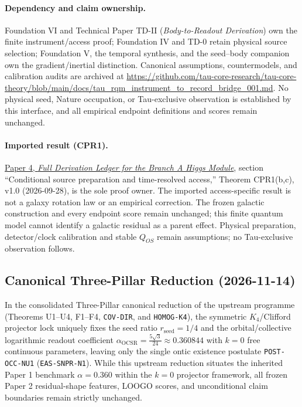 \documentclass[11pt]{article}
\begin{document}
\paragraph{Dependency and claim ownership.}
Foundation VI and Technical Paper TD-II (\emph{Body-to-Readout Derivation}) own the finite instrument/access proof; Foundation IV and TD-0 retain physical source selection; Foundation V, the temporal synthesis, and the seed--body companion own the gradient/inertial distinction. Canonical assumptions, countermodels, and calibration audits are archived at \url{https://github.com/tau-core-research/tau-core-theory/blob/main/docs/tau_rqm_instrument_to_record_bridge_001.md}. No physical seed, Nature occupation, or Tau-exclusive observation is established by this interface, and all empirical endpoint definitions and scores remain unchanged.

\paragraph{Imported result (CPR1).}
\href{https://github.com/tau-core-research/tau-core-higgs-module-paper4/blob/main/paper4_full_derivation/full_derivation.pdf#nameddest=cpr1}{Paper 4, \emph{Full Derivation Ledger for the Branch A Higgs Module}}, section ``Conditional source preparation and time-resolved access,'' Theorem CPR1(b,c), v1.0 (2026-09-28), is the sole proof owner.
The imported access-specific result is not a galaxy rotation law or an empirical correction. The frozen galactic construction and every endpoint score remain unchanged; this finite quantum model cannot identify a galactic residual as a parent effect.
Physical preparation, detector/clock calibration and stable $Q_{OS}$ remain assumptions; no Tau-exclusive observation follows.

\subsection{Canonical Three-Pillar Reduction (2026-11-14)}
In the consolidated Three-Pillar canonical reduction of the upstream programme (Theorems U1--U4, F1--F4, \texttt{COV-DIR}, and \texttt{HOMOG-K4}), the symmetric $K_4$/Clifford projector lock uniquely fixes the seed ratio $r_{\mathrm{seed}} = 1/4$ and the orbital/collective logarithmic readout coefficient $\alpha_{\mathrm{OCSR}} = \frac{5\sqrt{3}}{24} \approx 0.360844$ with $k = 0$ free continuous parameters, leaving only the single ontic existence postulate \texttt{POST-OCC-NU1} (\texttt{EAS-SNPR-N1}). While this upstream reduction situates the inherited Paper 1 benchmark $\alpha = 0.360$ within the $k = 0$ projector framework, all frozen Paper 2 residual-shape features, LOOGO scores, and unconditional claim boundaries remain strictly unchanged.
\end{document}
